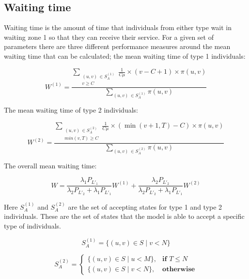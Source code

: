\subsection{Waiting time} \label{sec:waiting_time}

Waiting time is the amount of time that individuals from either type wait in 
waiting zone 1 so that they can receive their service. 
For a given set of parameters there are three different performance measures 
around the mean waiting time that can be calculated; the mean waiting time of
type 1 individuals:

\begin{equation} \label{eq:closed_form_waiting_type_1}
    W^{(1)} = \frac{\sum_{\substack{(u,v) \, \in S_A^{(1)} \\ v \geq C}} 
    \frac{1}{C \mu} \times (v-C+1) \times \pi(u,v)}{\sum_{(u,v) \, 
    \in S_A^{(1)}} \pi(u,v)}
\end{equation}

The mean waiting time of type 2 individuals:

\begin{equation}\label{eq:closed_form_waiting_type_2}
    W^{(2)} = \frac{\sum_{\substack{(u,v) \, \in S_A^{(2)} \\ min(v,T) \geq C}} 
    \frac{1}{C \mu} \times (\min(v+1,T)-C) \times \pi(u,v)}{\sum_{(u,v) \, 
    \in S_A^{(2)}} \pi(u,v)}
\end{equation} 

The overall mean waiting time:

\begin{equation}\label{eq:overall_waiting_time}
    W = \frac{\lambda_1 P_{L'_1}}{\lambda_2 P_{L'_2} + \lambda_1 P_{L'_1}} W^{(1)} 
    + \frac{\lambda_2 P_{L'_2}}{\lambda_2 P_{L'_2} + \lambda_1 P_{L'_1}} W^{(2)}
\end{equation}
 
Here \(S_A^{(1)}\) and \(S_A^{(2)}\) are the set of accepting states for type
1 and type 2 individuals. These are the set of states that the model is able
to accept a specific type of individuals.

\begin{equation}\label{eq:accepting_states_type_1}
    S_A^{(1)} = \{(u, v) \in S \; | \; v < N \}
\end{equation}

\begin{equation}\label{eq:accepting_states_type_2}
    S_A^{(2)}=
    \begin{cases}
        \{(u, v) \in S \; | \; u < M \}, & \textbf{if } T \leq N\\
        \{(u, v) \in S \; | \; v < N \}, & \textbf{otherwise}
    \end{cases}
\end{equation}

